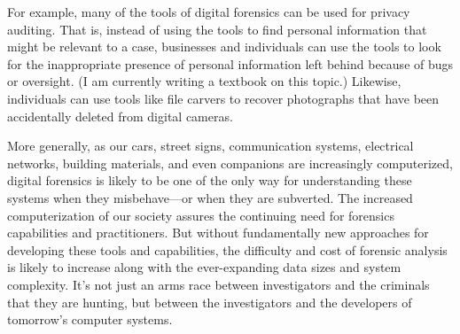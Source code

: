 For example, many of the tools of digital forensics can be used
for privacy auditing. That is, instead of using the tools to find
personal information that might be relevant to a case, businesses and
individuals can use the tools to look for the inappropriate presence of personal
information left behind because of bugs or oversight. (I am currently
writing a textbook on this topic.) Likewise, individuals can use tools
like file carvers to recover photographs that have been accidentally
deleted from digital cameras.

More generally, as our cars, street signs, communication systems,
electrical networks, building materials, and even companions are
increasingly computerized, digital forensics is likely to be one of
the only way for understanding these systems when they misbehave---or
when they are subverted. The increased computerization of our society
assures the continuing need for forensics capabilities and
practitioners. But without fundamentally new approaches for developing
these tools and capabilities, the difficulty and cost of forensic analysis is likely
to increase along with the ever-expanding data sizes and system
complexity. It's not just an arms race between investigators and the
criminals that they are hunting, but between the investigators and the
developers of tomorrow's computer systems.

